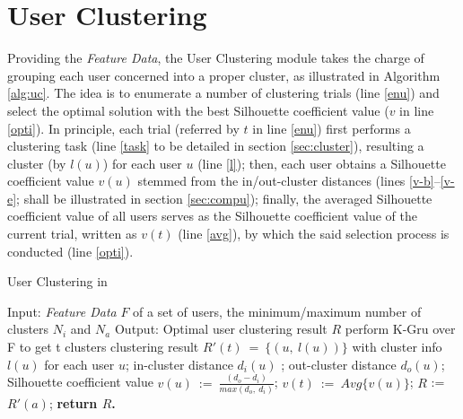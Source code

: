\section{User Clustering}
\label{sec:uc}


\par Providing the \textit{Feature Data}, the User Clustering module takes the charge of grouping each user concerned into a proper cluster,
as illustrated in  Algorithm \ref{alg:uc}.
%
The idea is to enumerate a number of clustering trials (line \ref{enu}) and select the optimal solution with the best Silhouette coefficient value ($v$ in line \ref{opti}).
In principle, each trial (referred by $t$ in line \ref{enu}) first performs a clustering task (line \ref{task} to be detailed in section \ref{sec:cluster}), resulting a cluster (by $l(u)$) for each user $u$ (line \ref{l});
then, each user obtains a Silhouette coefficient value $v(u)$ stemmed from the in/out-cluster distances (lines \ref{v-b}--\ref{v-e}; shall be illustrated in section \ref{sec:compu});
finally, the averaged Silhouette coefficient value of all users serves as the Silhouette coefficient value of the current trial, written as $v(t)$ (line \ref{avg}), by which the said selection process is conducted (line \ref{opti}).


\begin{algorithm}[t]
\begin{small}
\caption{User Clustering in \sys{}}
\label{alg:uc}
\begin{algorithmic}[1]
\State Input: \textit{Feature Data} $F$  of a set of users, the minimum/maximum number of clusters $N_i$ and $N_a$
\State Output: Optimal user clustering result $R$
\vspace{1ex}
 \label{enu}
    \State perform K-Gru over F to get t clusters
	\State clustering result $R'(t)\ =\ \{(u,\ l(u))\}$ with cluster info $l(u)$ for each user $u$; \label{l}
		\State in-cluster distance $d_i(u)$ \label{v-b};
		\State out-cluster distance $d_o(u)$;
		\State Silhouette coefficient value $v(u)\ :=\ \frac{(d_o - d_i)}{max(d_o,\ d_i)}$; \label{v-e}
	\EndFor
	\State $v(t)\ :=\ Avg\{v(u)\}$; \label{avg}
\EndFor
{} \label{opti}
	\State $R$ := $R'(a)$;
\EndIf
\State \bfseries{return} $R$.
\end{algorithmic}
\end{small}
\end{algorithm}


